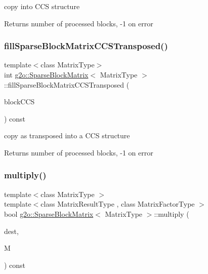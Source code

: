 copy into C\+CS structure \begin{DoxyReturn}{Returns}
number of processed blocks, -\/1 on error 
\end{DoxyReturn}
\mbox{\label{classg2o_1_1_sparse_block_matrix_a3808d27b1def55e9dd6e26b678d8f728}} 
\subsubsection{\texorpdfstring{fill\+Sparse\+Block\+Matrix\+C\+C\+S\+Transposed()}{fillSparseBlockMatrixCCSTransposed()}}
{\footnotesize\ttfamily template$<$class Matrix\+Type$>$ \\
int \mbox{\hyperlink{classg2o_1_1_sparse_block_matrix}{g2o\+::\+Sparse\+Block\+Matrix}}$<$ Matrix\+Type $>$\+::fill\+Sparse\+Block\+Matrix\+C\+C\+S\+Transposed (\begin{DoxyParamCaption}\item[{\mbox{\hyperlink{classg2o_1_1_sparse_block_matrix_c_c_s}{Sparse\+Block\+Matrix\+C\+CS}}$<$ Matrix\+Type $>$ \&}]{block\+C\+CS }\end{DoxyParamCaption}) const}

copy as transposed into a C\+CS structure \begin{DoxyReturn}{Returns}
number of processed blocks, -\/1 on error 
\end{DoxyReturn}
\mbox{\label{classg2o_1_1_sparse_block_matrix_abd1aa3a3ed3278b82945151b02223e1c}} 
\subsubsection{\texorpdfstring{multiply()}{multiply()}\hspace{0.1cm}{\footnotesize\ttfamily [1/2]}}
{\footnotesize\ttfamily template$<$class Matrix\+Type $>$ \\
template$<$class Matrix\+Result\+Type , class Matrix\+Factor\+Type $>$ \\
bool \mbox{\hyperlink{classg2o_1_1_sparse_block_matrix}{g2o\+::\+Sparse\+Block\+Matrix}}$<$ Matrix\+Type $>$\+::multiply (\begin{DoxyParamCaption}\item[{\mbox{\hyperlink{classg2o_1_1_sparse_block_matrix}{Sparse\+Block\+Matrix}}$<$ Matrix\+Result\+Type $>$ $\ast$\&}]{dest,  }\item[{const \mbox{\hyperlink{classg2o_1_1_sparse_block_matrix}{Sparse\+Block\+Matrix}}$<$ Matrix\+Factor\+Type $>$ $\ast$}]{M }\end{DoxyParamCaption}) const}



